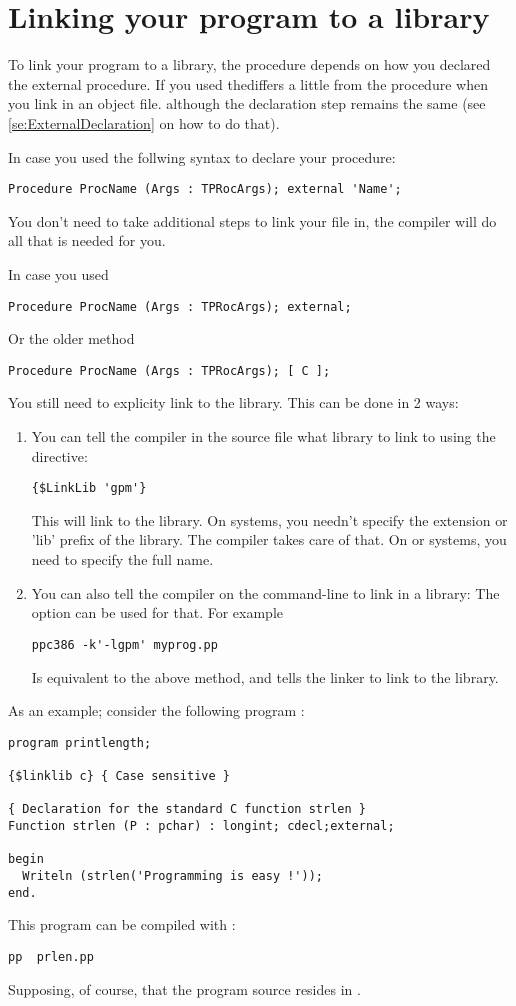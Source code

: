 \documentclass{report}
\begin{document}
\section{Linking your program to a library}
\label{se:LinkOut}
To link your program to a library, the procedure depends on how you declared
the external procedure. If you used thediffers a little from the
procedure when you link in an object file. although the declaration step 
remains the same (see \ref{se:ExternalDeclaration} on how to do that).

In case you used the follwing syntax to declare your procedure:
\begin{verbatim}
Procedure ProcName (Args : TPRocArgs); external 'Name';
\end{verbatim}
You don't need to take additional steps to link your file in, the compiler
will do all that is needed for you.

In case you used
\begin{verbatim}
Procedure ProcName (Args : TPRocArgs); external;
\end{verbatim}
Or the older method
\begin{verbatim}
Procedure ProcName (Args : TPRocArgs); [ C ];
\end{verbatim}
You still need to explicity link to the library. This can be done in 2 ways:
\begin{enumerate}
\item You can tell the compiler in the source file what library to link to
using the  directive:
\begin{verbatim}
{$LinkLib 'gpm'}
\end{verbatim}
This will link to the  library. On \linux systems, you needn't
specify the extension or 'lib' prefix of the library. The compiler takes
care of that. On \dos or \windows systems, you need to specify the full
name.
\item You can also tell the compiler on the command-line to link in a
library: The  option can be used for that. For example
\begin{verbatim}
ppc386 -k'-lgpm' myprog.pp
\end{verbatim}
Is equivalent to the above method, and tells the linker to link to the
 library. 
\end{enumerate}

As an example; consider the following program :
\begin{verbatim}
program printlength;

{$linklib c} { Case sensitive }

{ Declaration for the standard C function strlen }
Function strlen (P : pchar) : longint; cdecl;external;

begin
  Writeln (strlen('Programming is easy !'));
end.
\end{verbatim}
This program can be compiled with :
\begin{verbatim}
pp  prlen.pp
\end{verbatim}
Supposing, of course, that the program source resides in .
\end{document}
